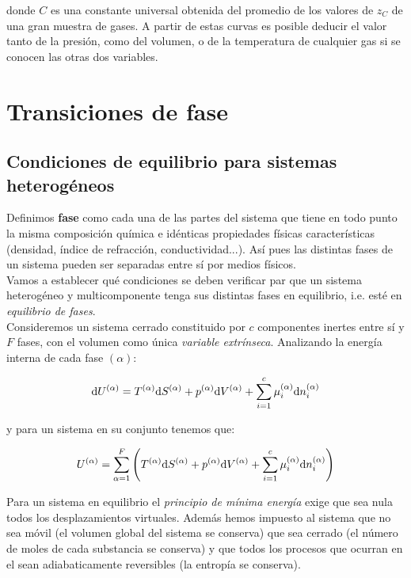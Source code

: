 \documentclass[12pt]{book}
\begin{document}
donde $C$ es una constante universal obtenida del promedio de los valores de $z_C$ de una gran muestra de gases. A partir de estas curvas es posible deducir el valor tanto de la presión, como del volumen, o de la temperatura de cualquier gas si se conocen las otras dos variables.



\chapter{Transiciones de fase}

\section{Condiciones de equilibrio para sistemas heterogéneos}

Definimos \textbf{fase} como cada una de las partes del sistema que tiene en todo punto la misma composición química e idénticas propiedades físicas características (densidad, índice de refracción, conductividad...). Así pues las distintas fases de un sistema pueden ser separadas entre sí por medios físicos.\\

Vamos a establecer qué condiciones se deben verificar par que un sistema heterogéneo y multicomponente tenga sus distintas fases en equilibrio, i.e. esté en \textit{equilibrio de fases}. \\

Consideremos un sistema cerrado constituido por $c$ componentes inertes entre sí y $F$ fases, con el volumen como única \textit{variable extrínseca}. Analizando la energía interna de cada fase $(\alpha)$:

$$ \mathrm{d} U^{(\alpha)} = T^{(\alpha)} \mathrm{d} S^{(\alpha)} + p^{(\alpha)} \mathrm{d} V^{(\alpha)} + \sum_{i=1}^c \mu_i^{(\alpha)} \mathrm{d} n_i^{(\alpha)} $$

y para un sistema en su conjunto tenemos que:

$$  U^{(\alpha)} = \sum_{\alpha=1}^F  \left( T^{(\alpha)} \mathrm{d} S^{(\alpha)} + p^{(\alpha)} \mathrm{d} V^{(\alpha)} + \sum_{i=1}^c \mu_i^{(\alpha)} \mathrm{d} n_i^{(\alpha)} \right) $$

Para un sistema en equilibrio el \textit{principio de mínima energía} exige que sea nula todos los desplazamientos virtuales. Además hemos impuesto al sistema que no sea móvil (el volumen global del sistema se conserva) que sea cerrado (el número de moles de cada substancia se conserva) y que todos los procesos que ocurran en el sean adiabaticamente reversibles (la entropía se conserva).\\
\end{document}
